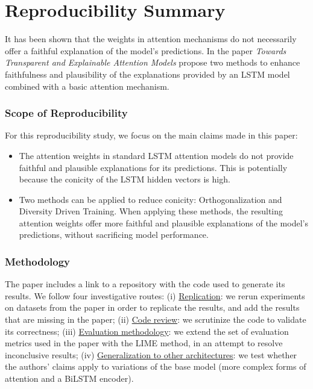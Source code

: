 \section*{\centering Reproducibility Summary}

It has been shown \citep{jain-wallace-2019-attention} that the weights in attention mechanisms do not necessarily offer a faithful explanation of the model's predictions. In the paper \textit{Towards Transparent and Explainable Attention Models} \citet{mohankumar_towards_2020} propose two methods to enhance faithfulness and plausibility of the explanations provided by an LSTM model combined with a basic attention mechanism. 

\subsubsection{Scope of Reproducibility}For this reproducibility study, we focus on the main claims made in this paper:
\begin{itemize}
    \item The attention weights in standard LSTM attention models do not provide faithful and plausible explanations for its predictions.
    This is potentially because the conicity of the LSTM hidden vectors is high. 
    \item Two methods can be applied to reduce conicity: Orthogonalization and Diversity Driven Training. When applying these methods, the resulting attention weights offer more faithful and plausible explanations of the model's predictions, without sacrificing model performance.
\end{itemize}

\subsubsection{Methodology}The paper includes a link to a repository with the code used to generate its results. We follow four investigative routes:
(i) \underline{Replication}: we rerun experiments on datasets from the paper in order to replicate the results, and add the results that are missing in the paper; 
(ii) \underline{Code review}: we scrutinize the code to validate its correctness;
(iii) \underline{Evaluation methodology}: we extend the set of evaluation metrics used in the paper with the LIME method, in an attempt to resolve inconclusive results;
(iv) \underline{Generalization to other architectures}: we test whether the authors' claims apply to variations of the base model (more complex forms of attention and a BiLSTM encoder).

